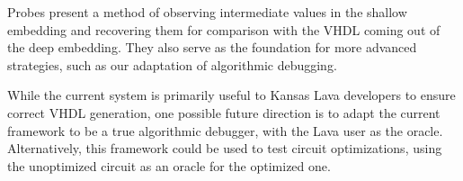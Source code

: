 \documentclass{llncs}
\begin{document}
Probes present a method of observing intermediate values in the shallow
embedding and recovering them for comparison with the VHDL coming out of
the deep embedding. They also serve as the foundation for more advanced 
strategies, such as our adaptation of algorithmic debugging.

While the current system is primarily useful to Kansas Lava developers to
ensure correct VHDL generation, one possible future direction is to adapt 
the current framework to be a true algorithmic debugger, with the Lava
user as the oracle. Alternatively, this framework could be used to test 
circuit optimizations, using the unoptimized circuit as an oracle for
the optimized one.
\end{document}
